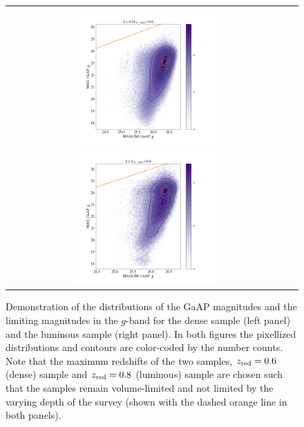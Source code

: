 \documentclass[fleqn,usenatbib,useAMS]{mnras}
\begin{document}
\begin{figure}
 
 \begin{tabular}{cc}
\includegraphics[width=0.5\textwidth]{figures_tmp/magg_lim_type_dense_zmax_0_6.png}
\includegraphics[width=0.5\textwidth]{figures_tmp/magg_lim_type_lum_zmax_0_8.png}
\end{tabular}
\caption{\label{fig:maglim_g} Demonstration of the distributions of the GaAP magnitudes and the limiting magnitudes in the $g$-band for the dense sample (left panel) and the luminous sample (right panel). In both figures the pixellized distributions and contours are color-coded by the number counts. Note that the maximum redshifts of the two samples, $z_{\rm red}=0.6$ (dense) sample and $z_{\rm red}=0.8$ (luminous) sample are chosen such that the samples remain volume-limited and not limited by the varying depth of the survey (shown with the dashed orange line in both panels).} 
\end{figure}
\end{document}
